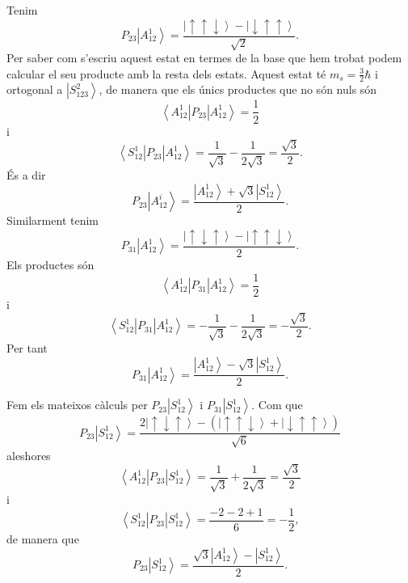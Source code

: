 \documentclass[12pt]{article}
\numberwithin{table}{section}
\numberwithin{figure}{section}
\numberwithin{equation}{section}
\renewcommand{\up}{\uparrow}
\newcommand{\down}{\downarrow}
\newcommand{\ket}[1]{\left\vert {#1} \right\rangle}
\newcommand{\bra}[1]{\left\langle #1 \right\vert}
\begin{document}
Tenim
\begin{equation*}
	P_{23}\ket{A_{12}^1} = \frac{\ket{\up\up\down} - \ket{\down\up\up}}{\sqrt{2}}.
\end{equation*}
Per saber com s'escriu aquest estat en termes de la base que hem trobat podem calcular el seu producte amb la resta dels estats. Aquest estat té \( m_s = \frac{3}{2}\hbar \) i ortogonal a \( \ket{S_{123}^2} \), de manera que els únics productes que no són nuls són
\begin{equation*}
	\bra{A_{12}^1}P_{23}\ket{A_{12}^1} = \frac{1}{2} 
\end{equation*}
i
\begin{equation*}
	\bra{S_{12}^1}P_{23}\ket{A_{12}^1} = \frac{1}{\sqrt{3}} - \frac{1}{2\sqrt{3}} = \frac{\sqrt{3}}{2}.
\end{equation*}
És a dir
\begin{equation}\label{eq:estat P23A12}
	P_{23}\ket{A_{12}^i} = \frac{\ket{A_{12}^1} + \sqrt{3}\ket{S_{12}^1}}{2}.
\end{equation}
Similarment tenim
\begin{equation*}
	P_{31}\ket{A_{12}^1} = \frac{\ket{\up\down\up} - \ket{\up\up\down}}{2}.
\end{equation*}
Els productes són
\begin{equation*}
	\bra{A_{12}^1}P_{31}\ket{A_{12}^1} = \frac{1}{2}
\end{equation*}
i
\begin{equation*}
	\bra{S_{12}^1}P_{31}\ket{A_{12}^1} = -\frac{1}{\sqrt{3}} - \frac{1}{2\sqrt{3}} = -\frac{\sqrt{3}}{2}.
\end{equation*}
Per tant
\begin{equation} \label{eq:estat P31A12}
	P_{31}\ket{A_{12}^1} = \frac{\ket{A_{12}^1} - \sqrt{3}\ket{S_{12}^1}}{2}.
\end{equation}

Fem els mateixos càlculs per \( P_{23}\ket{S_{12}^1} \) i \( P_{31}\ket{S_{12}^1} \). Com que
\begin{equation*}
	P_{23}\ket{S_{12}^1} = \frac{2\ket{\up\down\up} - (\ket{\up\up\down} + \ket{\down\up\up})}{\sqrt{6}}
\end{equation*}
aleshores
\begin{equation*}
	\bra{A_{12}^1}P_{23}\ket{S_{12}^1} = \frac{1}{\sqrt{3}} + \frac{1}{2\sqrt{3}} = \frac{\sqrt{3}}{2}
\end{equation*}
i
\begin{equation*}
	\bra{S_{12}^1}P_{23}\ket{S_{12}^1} =  \frac{-2 - 2 + 1}{6} = -\frac{1}{2},
\end{equation*}
de manera que
\begin{equation} \label{eq:estat P23S12}
	P_{23}\ket{S_{12}^1} = \frac{\sqrt{3}\ket{A_{12}^1} - \ket{S_{12}^1}}{2}.
\end{equation}
\end{document}
